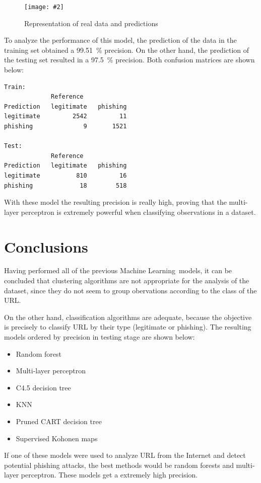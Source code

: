 \documentclass[12pt, a4paper]{article}
\newcommand{\figcaption}[4][H]{
  \begin{figure}[#1]
    \centering
    \texttt{[image: \#2]}
    \caption{#3}
    \label{fig:#2}
  \end{figure}
}
\newcommand*{\ML}{Machine Learning}
\begin{document}
    \figcaption{nn_test.png}{Representation of real data and predictions}{1}

    To analyze the performance of this model, the prediction of the data in the training set obtained a \SI{99.51}{\percent} precision. On the other hand, the prediction of the testing set resulted in a \SI{97.5}{\percent} precision. Both confusion matrices are shown below:

    \begin{verbatim}
Train:
             Reference
Prediction   legitimate   phishing
legitimate         2542         11
phishing              9       1521

Test:
             Reference
Prediction   legitimate   phishing
legitimate          810         16
phishing             18        518
      \end{verbatim}

      With these model the resulting precision is really high, proving that the multi-layer perceptron is extremely powerful when classifying observations in a dataset.

  \newpage
  \section*{Conclusions}

    Having performed all of the previous \ML\ models, it can be concluded that clustering algorithms are not appropriate for the analysis of the dataset, since they do not seem to group obervations according to the class of the URL.

    On the other hand, classification algorithms are adequate, because the objective is precisely to classify URL by their type (legitimate or phishing). The resulting models ordered by precision in testing stage are shown below:

    \begin{itemize}
      \item Random forest
      \item Multi-layer perceptron
      \item C4.5 decision tree
      \item KNN
      \item Pruned CART decision tree
      \item Supervised Kohonen maps
    \end{itemize}

    If one of these models were used to analyze URL from the Internet and detect potential phishing attacks, the best methods would be random forests and multi-layer perceptron. These models get a extremely high precision.
\end{document}

